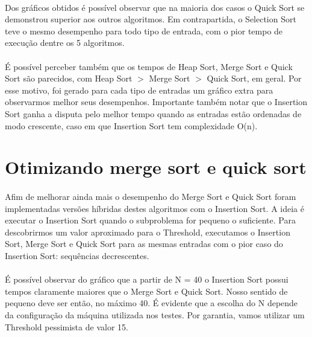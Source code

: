 \documentclass[11pt,a4paper]{article}
\begin{document}
    \paragraph{}
    Dos gráficos obtidos é possível observar que na maioria dos casos o Quick Sort se demonstrou superior aos outros algoritmos. Em contrapartida, o Selection Sort teve o mesmo desempenho para todo tipo de entrada, com o pior tempo de execução dentre os 5 algoritmos. 
    \paragraph{}
    É possível perceber também que os tempos de Heap Sort, Merge Sort e Quick Sort são parecidos, com Heap Sort $>$ Merge Sort $>$ Quick Sort, em geral. Por esse motivo, foi gerado para cada tipo de entradas um gráfico extra para observarmos melhor seus desempenhos. Importante também notar que o Insertion Sort ganha a disputa pelo melhor tempo quando as entradas estão ordenadas de modo crescente, caso em que Insertion Sort tem complexidade O(n).

    \section{Otimizando merge sort e quick sort}
    \paragraph{}
    Afim de melhorar ainda mais o desempenho do Merge Sort e Quick Sort foram implementadas versões híbridas destes algoritmos com o Insertion Sort. A ideia é executar o Insertion Sort quando o subproblema for pequeno o suficiente. Para descobrirmos um valor aproximado para o Threshold, executamos o Insertion Sort, Merge Sort e Quick Sort para as mesmas entradas com o pior caso do Insertion Sort: sequências decrescentes. 

    \paragraph{}
    É possível observar do gráfico que a partir de N = 40 o Insertion Sort possui tempos claramente maiores que o Merge Sort e Quick Sort. Nosso sentido de pequeno deve ser então, no máximo 40. É evidente que a escolha do N depende da configuração da máquina utilizada nos testes. Por garantia, vamos utilizar um Threshold pessimista de valor 15.
\end{document}

